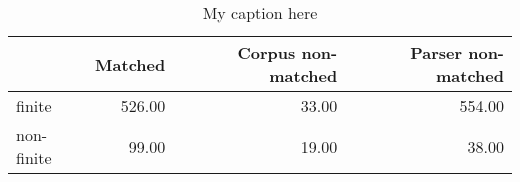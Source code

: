 \begin{table}[!ht]
\centering
\begin{tabular}{lrrr}
\toprule
{} &  Matched &  Corpus non-matched &  Parser non-matched \\
\midrule
finite     &   526.00 &               33.00 &              554.00 \\
non-finite &    99.00 &               19.00 &               38.00 \\
\bottomrule
\end{tabular}
\caption{My caption here}
\label{tab:FINITENESS-ocd-data}
\end{table}